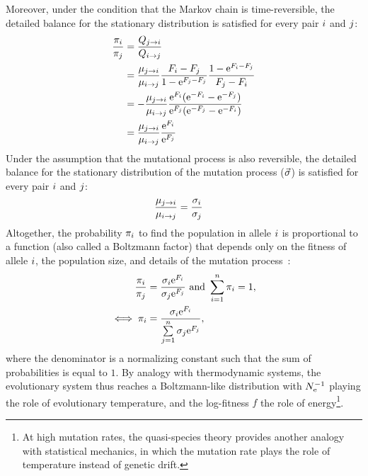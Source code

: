 Moreover, under the condition that the \gls{Markov chain} is time-reversible, the detailed balance for the stationary distribution is satisfied for every pair ${i}$ and ${j}$:
\begin{align}
    \dfrac{\pi_{{i}}}{\pi_{{j}}} & = \dfrac{Q_{{j} \to {i}}}{Q_{{i} \to {j}}} \\
    & = \dfrac{\mu_{{j} \to {i}}}{\mu_{{i} \to {j}}}  \dfrac{F_{{i}}-F_{{j}}}{ 1 - \text{e}^{F_{{j}}-F_{{j}}}}  \dfrac{1 - \text{e}^{F_{{i}} - F_{{j}}} }{F_{{j}} - F_{{i}}}\\
    & = - \dfrac{\mu_{{j} \to {i}}}{\mu_{{i} \to {j}}}  \dfrac{ \text{e}^{F_{{i}}}(\text{e}^{-F_{{i}}} - \text{e}^{- F_{{j}}}) }{ \text{e}^{F_{{j}}}(\text{e}^{-F_{{j}}} - \text{e}^{- F_{{i}}})}  \\
    & = \dfrac{\mu_{{j} \to {i}}}{\mu_{{i} \to {j}}} \dfrac{\text{e}^{F_{{i}}}}{\text{e}^{F_{{j}}}} \\
\end{align}
Under the assumption that the mutational process is also reversible, the detailed balance for the stationary distribution of the mutation process ($\vec{\sigma}$) is satisfied for every pair ${i}$ and ${j}$:
\begin{align}
    \dfrac{\mu_{{j} \to {i}}}{\mu_{{i} \to {j}}} & = \dfrac{\sigma_{{i}}}{\sigma_{{j}}}
\end{align}
Altogether, the probability $\pi_{{i}}$ to find the population in \gls{allele} ${i}$ is proportional to a function (also called a Boltzmann factor) that depends only on the fitness of \gls{allele} ${i}$, the population size, and details of the mutation process~\citep{Sella2005,Mustonen2005}:
\begin{align}
    \dfrac{\pi_{{i}}}{\pi_{{j}}} & = \dfrac{\sigma_{{i}}\text{e}^{F_{{i}}}}{\sigma_{{j}}\text{e}^{F_{{j}}}} \text{ and } \sum\limits_{{i}=1}^{n}\pi_{{i}} = 1, \\
    \iff \pi_{{i}} & = \dfrac{\sigma_{{i}}\text{e}^{F_{{i}}}}{\sum\limits_{{j}=1}^{n} \sigma_{{j}}\text{e}^{F_{{j}}} }, \label{eq:equilibrium-mut-sel}
\end{align}
where the denominator is a normalizing constant such that the sum of probabilities is equal to $1$.
By analogy with thermodynamic systems, the evolutionary system thus reaches a Boltzmann-like distribution with $N_{\text{e}}^{-1}$ playing the role of evolutionary temperature, and the log-fitness $f$ the role of energy\footnote{At high mutation rates, the quasi-species theory provides another analogy with statistical mechanics, in which the mutation rate plays the role of temperature instead of \gls{genetic drift}.}.

